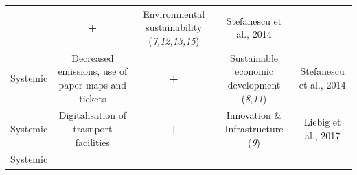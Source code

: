 \documentclass[
]{book}
\begin{document}
\begin{longtable}[]{@{}ccccc@{}}
\begin{minipage}[t]{0.16\columnwidth}
\end{minipage} & \begin{minipage}[t]{0.17\columnwidth}\centering
\textbf{+}\strut
\end{minipage} & \begin{minipage}[t]{0.17\columnwidth}\centering
Environmental sustainability (\emph{7,12,13,15})\strut
\end{minipage} & \begin{minipage}[t]{0.17\columnwidth}\centering
Stefanescu et al., 2014\strut
\end{minipage}\tabularnewline
\begin{minipage}[t]{0.17\columnwidth}\centering
Systemic\strut
\end{minipage} & \begin{minipage}[t]{0.16\columnwidth}\centering
Decreased emissions, use of paper maps and tickets\strut
\end{minipage} & \begin{minipage}[t]{0.17\columnwidth}\centering
\textbf{+}\strut
\end{minipage} & \begin{minipage}[t]{0.17\columnwidth}\centering
Sustainable economic development (\emph{8,11})\strut
\end{minipage} & \begin{minipage}[t]{0.17\columnwidth}\centering
Stefanescu et al., 2014\strut
\end{minipage}\tabularnewline
\begin{minipage}[t]{0.17\columnwidth}\centering
Systemic\strut
\end{minipage} & \begin{minipage}[t]{0.16\columnwidth}\centering
Digitalisation of trasnport facilities\strut
\end{minipage} & \begin{minipage}[t]{0.17\columnwidth}\centering
\textbf{+}\strut
\end{minipage} & \begin{minipage}[t]{0.17\columnwidth}\centering
Innovation \& Infrastructure (\emph{9})\strut
\end{minipage} & \begin{minipage}[t]{0.17\columnwidth}\centering
Liebig et al., 2017\strut
\end{minipage}\tabularnewline
\begin{minipage}[t]{0.17\columnwidth}\centering
Systemic\strut
\end{minipage} & \begin{minipage}[t]{0.16\columnwidth}\centering

\end{minipage}
\end{longtable}
\end{document}
